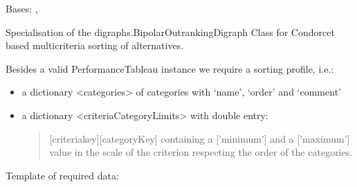 \documentclass[letterpaper,10pt,english]{sphinxmanual}
\begin{document}
\begin{fulllineitems}
\label{techDoc:sortingDigraphs.SortingDigraph}
Bases: {\hyperref[techDoc:outrankingDigraphs.BipolarOutrankingDigraph]{\emph{}}}, {\hyperref[techDoc:perfTabs.PerformanceTableau]{\emph{}}}

Specialisation of the digraphs.BipolarOutrankingDigraph Class
for Condorcet based multicriteria sorting of alternatives.

Besides a valid PerformanceTableau instance we require a sorting profile,
i.e.:
\begin{itemize}
\item {} 
a dictionary \textless{}categories\textgreater{} of categories with `name', `order' and `comment'

\item {} 
a dictionary \textless{}criteriaCategoryLimits\textgreater{} with double entry:
\begin{quote}

{[}criteriakey{]}{[}categoryKey{]} containing a {[}'minimum'{]} and
a  {[}'maximum'{]} value in the scale of the criterion
respecting the order of the categories.
\end{quote}

\end{itemize}

Template of required data:


\end{fulllineitems}
\end{document}
